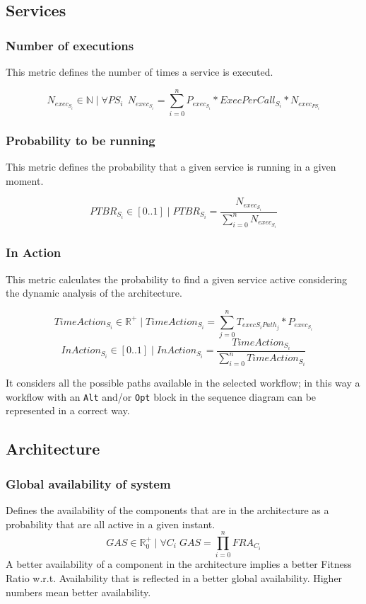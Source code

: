 \subsection{Services}
\subsubsection{Number of executions}
This metric defines the number of times a service is executed.

\[ N_{exec_{S_i}} \in \mathbb{N} \; | \; \forall PS_i \;\, N_{exec_{S_i}} = \sum_{i=0}^{n} P_{exec_{S_i}} * ExecPerCall_{S_i} * N_{exec_{PS_i}} \]

\subsubsection{Probability to be running}
This metric defines the probability that a given service is running in a given moment.

\[ PTBR_{S_i} \in [0..1] \; | \; PTBR_{S_i} =  \frac{{N_{exec_{S_i}}}}{ \sum_{i=0}^{n}  N_{exec_{S_i}}} \]

\subsubsection{In Action}
This metric calculates the probability to find a given service active considering the dynamic analysis of the architecture.

\[ TimeAction_{S_i} \in \mathbb{R}^+ \; | \; TimeAction_{S_i}=\sum_{j=0}^{n} T_{exec{S_i}Path_j} * P_{exec_{S_i}} \]
\[ InAction_{S_i} \in [0..1] \; | \; InAction_{S_i} = \frac{TimeAction_{S_i}}{{\sum_{i=0}^n}TimeAction_{S_i}} \]

It considers all the possible paths available in the selected workflow; in this way a workflow with an \texttt{Alt} and/or \texttt{Opt} block in the sequence diagram can be represented in a correct way.

\subsection{Architecture}
\subsubsection{Global availability of system}
Defines the availability of the components that are in the architecture as a probability that are all active in a given instant.
\[ GAS \in \mathbb{R}^+_0 \; | \; \forall C_i \; GAS = \prod_{i=0}^{n} FRA_{C_i} \]
A better availability of a component in the architecture implies a better Fitness Ratio w.r.t. Availability that is reflected in a better global availability. Higher numbers mean better availability.
